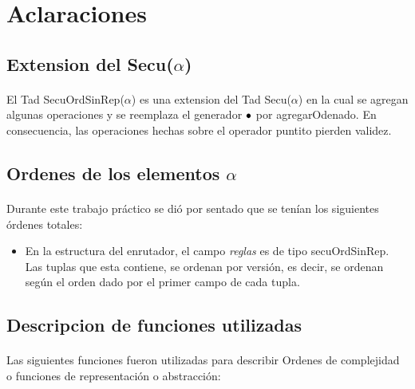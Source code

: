 \section*{Aclaraciones}

\subsection*{Extension del Secu($\alpha$)}
\paragraph{}
El Tad SecuOrdSinRep($\alpha$) es una extension del Tad Secu($\alpha$) en la cual se agregan algunas operaciones y se reemplaza el generador $\bullet$ por agregarOdenado. En consecuencia, las operaciones hechas sobre el operador puntito pierden validez.

\subsection*{Ordenes de los elementos $\alpha$}
\paragraph{}
Durante este trabajo pr\'actico se di\'o por sentado que se ten\'ian los siguientes \'ordenes totales:

\begin{itemize}
\item En la estructura del enrutador, el campo \textit{reglas} es de tipo secuOrdSinRep. Las tuplas que esta contiene, se ordenan por versi\'on, es decir, se ordenan seg\'un el orden dado por el primer campo de cada tupla.
\end{itemize}






\subsection*{Descripcion de funciones utilizadas}
\paragraph{}
Las siguientes funciones fueron utilizadas para describir Ordenes de complejidad o funciones de representaci\'on o abstracci\'on:


